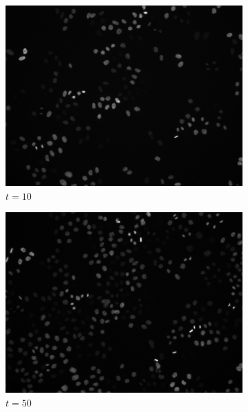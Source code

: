 \begin{figure}[h]
    \centering
    \begin{subfigure}{0.32\textwidth}
        \centering
        \includegraphics[width=\textwidth]{images/gmm/data/C/10.png}
        \caption{$t=10$}
        \label{fig:gmm-data-c-early}
    \end{subfigure}
    \hfill
    \begin{subfigure}{0.32\textwidth}
        \centering
        \includegraphics[width=\textwidth]{images/gmm/data/C/50.png}
        \caption{$t=50$}
        \label{fig:gmm-data-c-mid}
    \end{subfigure}
    \hfill
    \begin{subfigure}{0.32\textwidth}

\end{subfigure}
\end{figure}
